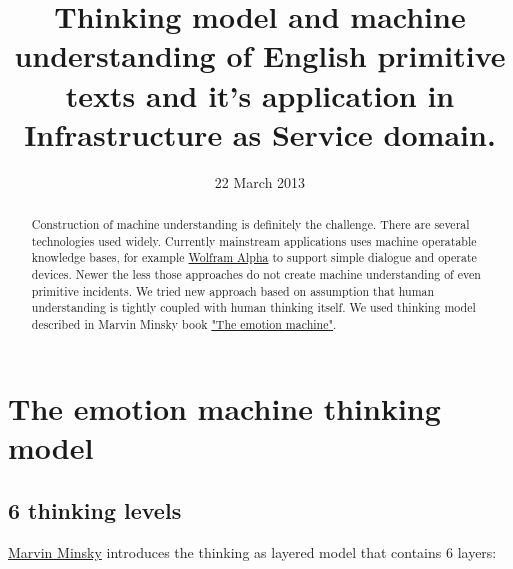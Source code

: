 \documentclass[conference]{IEEEtran}
\begin{document}
\title{Thinking model and machine understanding of English primitive texts and it's application in Infrastructure as Service domain.}

\author{
\and
{}
}

\date{22 March 2013}

\maketitle

\begin{abstract}

Construction of machine understanding is definitely the challenge. There are several technologies used widely.
Currently mainstream applications uses machine operatable knowledge bases, for example \href{http://www.wolframalpha.com}{Wolfram Alpha}\cite{wolfram_alpha} to support simple dialogue and operate devices.
Newer the less those approaches do not create machine understanding of even primitive incidents.
We tried new approach based on assumption that human understanding is tightly coupled with human thinking itself.
We used thinking model described in Marvin Minsky book \href{http://en.wikipedia.org/wiki/The_Emotion_Machine}{"The emotion machine"}\cite{minsk}.


\end{abstract}

\section{The emotion machine thinking model}
\subsection{6 thinking levels}

\href{http://web.media.mit.edu/~minsky/E5/eb5.html}{Marvin Minsky} introduces the thinking as layered model that contains 6 layers:
\end{document}
